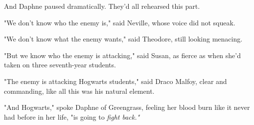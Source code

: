 And Daphne paused dramatically. They'd all rehearsed this part.

"We don't know who the enemy is," said Neville, whose voice did not squeak.

"We don't know what the enemy wants," said Theodore, still looking menacing.

"But we know who the enemy is attacking," said Susan, as fierce as when she'd taken on three seventh-year students.

"The enemy is attacking Hogwarts students," said Draco Malfoy, clear and commanding, like all this was his natural element.

"And Hogwarts," spoke Daphne of Greengrass, feeling her blood burn like it never had before in her life, "is going to \emph{fight back."}